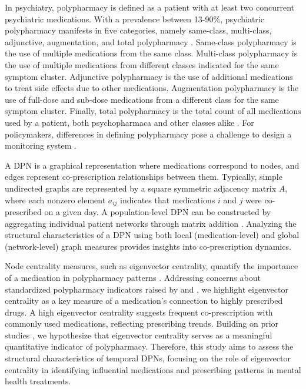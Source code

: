 \documentclass[
  authoryear,
  review]{elsarticle}
\begin{document}
In psychiatry, polypharmacy is defined as a patient with at least two
concurrent psychiatric medications. With a prevalence between 13-90\%,
psychiatric polypharmacy manifests in five categories, namely
same-class, multi-class, adjunctive, augmentation, and total
polypharmacy \citep{Shrivastava2013}. Same-class polypharmacy is the use
of multiple medications from the same class. Multi-class polypharmacy is
the use of multiple medications from different classes indicated for the
same symptom cluster. Adjunctive polypharmacy is the use of additional
medications to treat side effects due to other medications. Augmentation
polypharmacy is the use of full-dose and sub-dose medications from a
different class for the same symptom cluster. Finally, total
polypharmacy is the total count of all medications used by a patient,
both psychopharmaca and other classes alike \citep{Shrivastava2013}. For
policymakers, differences in defining polypharmacy pose a challenge to
design a monitoring system \citep{Sirois2016}.

A DPN is a graphical representation where medications correspond to
nodes, and edges represent co-prescription relationships between them.
Typically, simple undirected graphs are represented by a square
symmetric adjacency matrix \(A\), where each nonzero element \(a_{ij}\)
indicates that medications \(i\) and \(j\) were co-prescribed on a given
day. A population-level DPN can be constructed by aggregating individual
patient networks through matrix addition \citep{Cavallo2012}. Analyzing
the structural characteristics of a DPN using both local
(medication-level) and global (network-level) graph measures provides
insights into co-prescription dynamics.

Node centrality measures, such as eigenvector centrality, quantify the
importance of a medication in polypharmacy patterns \citep{Askar2021}.
Addressing concerns about standardized polypharmacy indicators raised by
\citet{Sirois2016} and \citet{Delara2022}, we highlight eigenvector
centrality as a key measure of a medication's connection to highly
prescribed drugs. A high eigenvector centrality suggests frequent
co-prescription with commonly used medications, reflecting prescribing
trends. Building on prior studies \citep{Cavallo2012, Bazzoni2015}, we
hypothesize that eigenvector centrality serves as a meaningful
quantitative indicator of polypharmacy. Therefore, this study aims to
assess the structural characteristics of temporal DPNs, focusing on the
role of eigenvector centrality in identifying influential medications
and prescribing patterns in mental health treatments.
\end{document}
